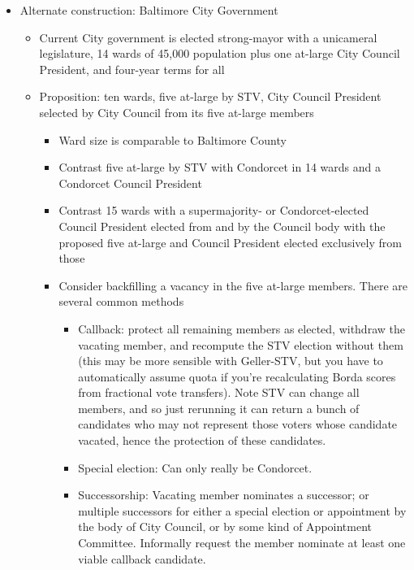 \begin{itemize}
    \item Alternate construction:  Baltimore City Government
    \begin{itemize}
        \item Current City government is elected strong-mayor with a unicameral legislature, 14 wards of 45,000 population plus one at-large City Council President, and four-year terms for all

        \item Proposition:  ten wards, five at-large by STV, City Council President selected by City Council from its five at-large members
        \begin{itemize}
            \item Ward size is comparable to Baltimore County

            \item Contrast five at-large by STV with Condorcet in 14 wards and a Condorcet Council President

            \item Contrast 15 wards with a supermajority- or Condorcet-elected Council President elected from and by the Council body with the proposed five at-large and Council President elected exclusively from those

            \item Consider backfilling a vacancy in the five at-large members.  There are several common methods
            \begin{itemize}
                \item Callback:  protect all remaining members as elected, withdraw the vacating member, and recompute the STV election without them (this may be more sensible with Geller-STV, but you have to automatically assume quota if you're recalculating Borda scores from fractional vote transfers).  Note STV can change all members, and so just rerunning it can return a bunch of candidates who may not represent those voters whose candidate vacated, hence the protection of these candidates.

                \item Special election:  Can only really be Condorcet.

                \item Successorship:  Vacating member nominates a successor; or multiple successors for either a special election or appointment by the body of City Council, or by some kind of Appointment Committee.  Informally request the member nominate at least one viable callback candidate.


\end{itemize}
\end{itemize}
\end{itemize}
\end{itemize}
